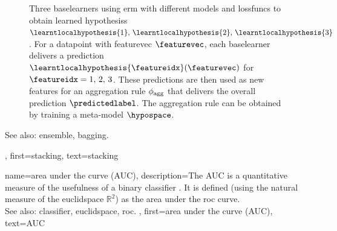 {{\begin{figure}[H]
\begin{center}
		\caption{Three \glspl{baselearner} using \gls{erm} with 
			different \glspl{model} and \glspl{lossfunc} to obtain learned \glspl{hypothesis} 
			$\learntlocalhypothesis{1},\,\learntlocalhypothesis{2},\,\learntlocalhypothesis{3}$. 
			For a \gls{datapoint} with \gls{featurevec} $\featurevec$, each \gls{baselearner} delivers a \gls{prediction}  
			$\learntlocalhypothesis{\featureidx}(\featurevec)$ for $\featureidx=1,\,2,\,3$. These 
			\glspl{prediction} are then used as new \glspl{feature} for an aggregation 
			rule $\phi_{\rm agg}$ that delivers the overall \gls{prediction} $\predictedlabel$. 
			The aggregation rule can be obtained by \gls{training} a meta-\gls{model} $\hypospace$.}
			\end{center}
		\end{figure}
	 	See also: \gls{ensemble}, \gls{bagging}.},
	 first={stacking},
	 text={stacking} 
}

{name={area under the curve (AUC)}, 
	description={The AUC is a quantitative \gls{measure} of the 
 		usefulness of a binary \gls{classifier} \cite{Hanley:1982aa}. It 
		is defined (using the natural \gls{measure} of the \gls{euclidspace} $\mathbb{R}^{2}$) as the area  
		under the \gls{roc} curve.
		\\
		See also: \gls{classifier}, \gls{euclidspace}, \gls{roc}. } , 
 	first={area under the curve (AUC)}, 
 	text={AUC} 
}

